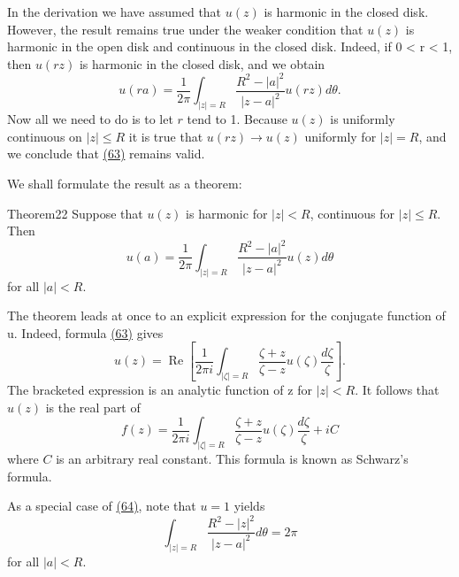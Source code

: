 In the derivation we have assumed that $u(z)$ is harmonic in the closed disk. However, the result remains true under the weaker condition that $u(z)$ is harmonic in the open disk and continuous in the closed disk. Indeed, if 0 < r < 1, then $u(rz)$ is harmonic in the closed disk, and we obtain
\begin{equation*}
u (r a) = \frac {1}{2 \pi} \int_ {| z | = R} \frac {R ^ {2} - | a | ^ {2}}{| z - a | ^ {2}} u (r z) d \theta .
\end{equation*}
Now all we need to do is to let $r$ tend to 1. Because $u(z)$ is uniformly continuous on $|z| \leq R$ it is true that $u(rz) \to u(z)$ uniformly for $|z| = R$, and we conclude that \hyperref[eq:4.63]{(63)} remains valid.

We shall formulate the result as a theorem:

\begin{originalstatement}{Theorem}{22}\label{thm:4.22}
Suppose that $u(z)$ is harmonic for $|z| < R$, continuous for $|z| \leq R$. Then
\begin{equation*}
u (a) = \frac {1}{2 \pi} \int_ {| z | = R} \frac {R ^ {2} - | a | ^ {2}}{| z - a | ^ {2}} u (z) d \theta\tag{64}\label{eq:4.64}
\end{equation*}
for all $|a| < R$.

\end{originalstatement}
The theorem leads at once to an explicit expression for the conjugate function of u. Indeed, formula \hyperref[eq:4.63]{(63)} gives
\begin{equation*}
u (z) = \operatorname{Re} \left[ \frac {1}{2 \pi i} \int_ {| \zeta | = R} \frac {\zeta + z}{\zeta - z} u (\zeta) \frac {d \zeta}{\zeta} \right].\tag{65}\label{eq:4.65}
\end{equation*}
The bracketed expression is an analytic function of z for $|z| < R$. It follows that $u(z)$ is the real part of
\begin{equation*}
f (z) = \frac {1}{2 \pi i} \int_ {| \zeta | = R} \frac {\zeta + z}{\zeta - z} u (\zeta) \frac {d \zeta}{\zeta} + i C\tag{66}\label{eq:4.66}
\end{equation*}
where $C$ is an arbitrary real constant. This formula is known as Schwarz's formula.

As a special case of \hyperref[eq:4.64]{(64)}, note that $u = 1$ yields
\begin{equation*}
\int_ {| z | = R} \frac {R ^ {2} - | z | ^ {2}}{| z - a | ^ {2}} d \theta = 2 \pi\tag{67}\label{eq:4.67}
\end{equation*}
for all $|a| < R$.

